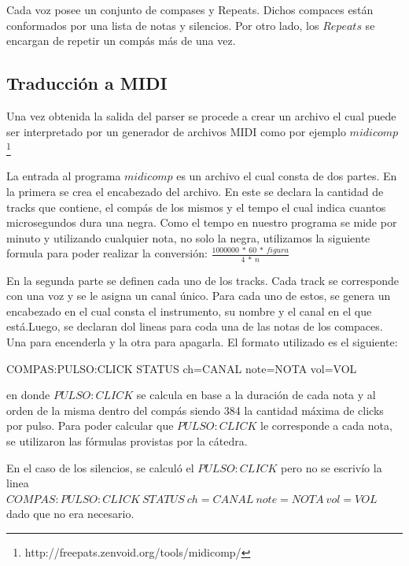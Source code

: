 \documentclass[a4paper, 10pt, twoside]{article}
\begin{document}
Cada voz posee un conjunto de compases y Repeats. Dichos compaces están conformados por una lista de notas y silencios. Por otro lado, los $Repeats$ se encargan de repetir un compás más de una vez.

\subsection{Traducción a MIDI}
Una vez obtenida la salida del parser se procede a crear un archivo el cual puede ser interpretado por un generador de archivos MIDI como por ejemplo $midicomp$ \footnote{http://freepats.zenvoid.org/tools/midicomp/}

La entrada al programa $midicomp$ es un archivo el cual consta de dos partes. En la primera se crea el encabezado del archivo. En este se declara la cantidad de tracks que contiene, el compás de los mismos y el tempo el cual indica cuantos microsegundos dura una negra. Como el tempo en nuestro programa se mide por minuto y utilizando cualquier nota, no solo la negra, utilizamos la siguiente formula para poder realizar la conversión:
$\frac{1000000\ *\ 60\ *\ figura}{4\ *\ n}$

En la segunda parte se definen cada uno de los tracks. Cada track se corresponde con una voz y se le asigna un canal único. Para cada uno de estos, se genera un encabezado en el cual consta el instrumento, su nombre y el canal en el que está.Luego, se declaran dol lineas para coda una de las notas de los compaces. Una para encenderla y la otra para apagarla. El formato utilizado es el siguiente:

\begin{center} 
COMPAS:PULSO:CLICK STATUS ch=CANAL note=NOTA vol=VOL
\end{center}

en donde $PULSO:CLICK$ se calcula en base a la duración de cada nota y al orden de la misma dentro del compás siendo 384 la cantidad máxima de clicks por pulso. Para poder calcular que $PULSO:CLICK$ le corresponde a cada nota, se utilizaron las fórmulas provistas por la cátedra.

En el caso de los silencios, se calculó el $PULSO:CLICK$ pero no se escrivío la linea $COMPAS:PULSO:CLICK\ STATUS\ ch=CANAL\ note=NOTA\ vol=VOL$ dado que no era necesario.

\newpage

\end{document}
